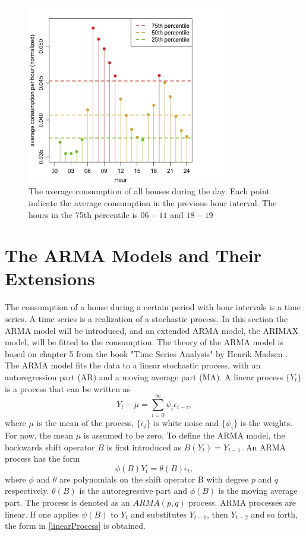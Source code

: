 \begin{figure}
    \centering
    \includegraphics[width=0.8\textwidth]{../../../figures/HourDistribution.jpeg}
    \caption{The average consumption of all houses during the day. Each point indicate the average consumption in the previous hour interval. The hours in the 75th percentile is $06-11$ and $18-19$}
    \label{fig:HourDistribution}
\end{figure}


\section{The ARMA Models and Their Extensions}
The consumption of a house during a certain period with hour intervals is a time series. A time series is a realization of a stochastic process. In this section the ARMA model will be introduced, and an extended ARMA model, the ARIMAX model, will be fitted to the consumption. The theory of the ARMA model is based on chapter 5 from the book "Time Series Analysis" by Henrik Madsen \cite{Time_Series_Analysis}. The ARMA model fits the data to a linear stochastic process, with an autoregression part (AR) and a moving average part (MA). A linear process $\{Y_t\}$ is a process that can be written as
\begin{equation}
    Y_t - \mu = \sum_{i=0}^{\infty} \psi_i \epsilon_{t-i}, \label{linearProcess}
\end{equation}
where $\mu$ is the mean of the process, $\{\epsilon_i\}$ is white noise and $\{\psi_i\}$ is the weights. For now, the mean $\mu$ is assumed to be zero. To define the ARMA model, the backwards shift operator $B$ is first introduced as $B(Y_t) = Y_{t-1}$. An ARMA process has the form
\begin{equation}
    \phi (B)Y_t = \theta (B) \epsilon_t,
\end{equation}
where $\phi$ and $\theta$ are polynomials on the shift operator B with degree $p$ and $q$ respectively. $\theta(B)$ is the autoregressive part and $\phi(B)$ is the moving average part. The process is denoted as an $ARMA(p,q)$ process. ARMA processes are linear. If one applies $\psi(B)$ to $Y_t$ and substitutes $Y_{t-1}$, then $Y_{t-2}$ and so forth, the form in \cref{linearProcess} is obtained.

